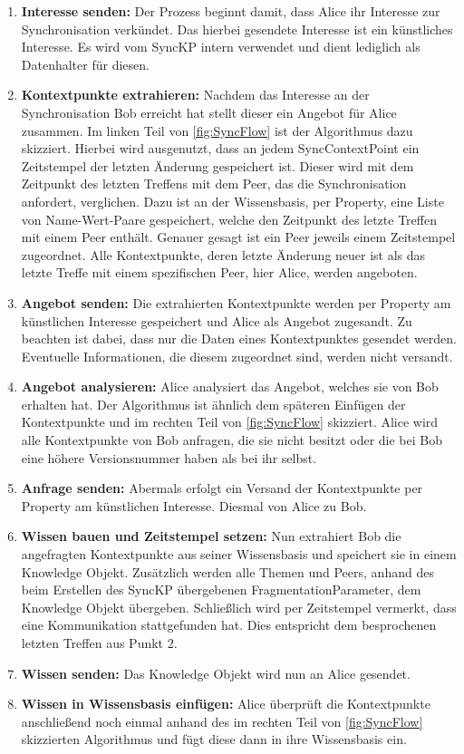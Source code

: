 \documentclass[a4paper]{article}
\begin{document}
	\begin{enumerate}
		\item \textbf{Interesse senden:} Der Prozess beginnt damit, dass Alice
		ihr Interesse zur Synchronisation verkündet. Das hierbei gesendete
		Interesse ist ein künstliches Interesse. Es wird vom SyncKP intern
		verwendet und dient lediglich als Datenhalter für diesen.
		\item \textbf{Kontextpunkte extrahieren:} Nachdem das Interesse an der
		Synchronisation Bob erreicht hat stellt dieser ein Angebot für Alice
		zusammen. Im linken Teil von \autoref{fig:SyncFlow} ist der
		Algorithmus dazu skizziert. Hierbei wird ausgenutzt, dass an jedem
		SyncContextPoint ein Zeitstempel der letzten Änderung gespeichert ist.
		Dieser wird mit dem Zeitpunkt des letzten Treffens mit dem Peer,
		das die Synchronisation anfordert, verglichen. Dazu ist an der
		Wissensbasis, per Property, eine Liste von Name-Wert-Paare gespeichert, 
		welche den Zeitpunkt des letzte Treffen mit einem Peer enthält.
		Genauer gesagt ist ein Peer jeweils einem Zeitstempel zugeordnet. Alle
		Kontextpunkte, deren letzte Änderung neuer ist als das letzte Treffe mit
		einem spezifischen Peer, hier Alice, werden angeboten.
		\item \textbf{Angebot senden:} Die extrahierten Kontextpunkte werden per
		Property am künstlichen Interesse gespeichert und Alice als Angebot
		zugesandt. Zu beachten	ist dabei, dass nur die Daten eines Kontextpunktes
		gesendet werden. Eventuelle Informationen, die diesem zugeordnet sind,
		werden nicht versandt.
		\item \textbf{Angebot analysieren:} Alice analysiert das Angebot, welches
		sie von Bob erhalten hat. Der Algorithmus ist ähnlich dem späteren Einfügen
		der Kontextpunkte und im rechten Teil von \autoref{fig:SyncFlow}
		skizziert. Alice wird alle Kontextpunkte von Bob anfragen, die sie
		nicht besitzt oder die bei Bob eine höhere Versionsnummer haben als
		bei ihr selbst.
		\item \textbf{Anfrage senden:} Abermals erfolgt ein Versand der
		Kontextpunkte per Property am künstlichen Interesse. Diesmal von Alice 
		zu Bob.
		\newpage
		\item \textbf{Wissen bauen und Zeitstempel setzen:} Nun extrahiert Bob die
		angefragten	Kontextpunkte aus seiner Wissensbasis und speichert sie in einem
		Knowledge Objekt. Zusätzlich werden	alle Themen und Peers,
		anhand des beim Erstellen des SyncKP übergebenen FragmentationParameter,
		dem Knowledge Objekt übergeben. Schließlich wird per Zeitstempel vermerkt,
		dass eine Kommunikation stattgefunden hat. Dies entspricht dem
		besprochenen letzten Treffen aus Punkt 2.
		\item \textbf{Wissen senden:} Das Knowledge Objekt wird nun an Alice
		gesendet.
		\item \textbf{Wissen in Wissensbasis einfügen:} Alice überprüft 
		die Kontextpunkte anschließend noch einmal anhand des im rechten Teil von
		\autoref{fig:SyncFlow} skizzierten Algorithmus und fügt diese dann in
		ihre Wissensbasis ein.
	\end{enumerate} 	
	
\end{document}
